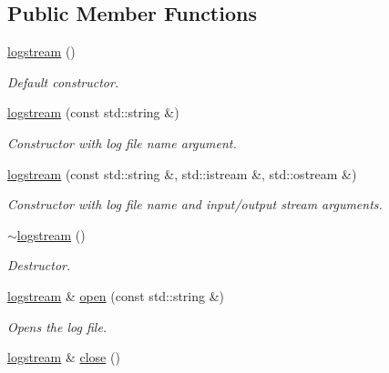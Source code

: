 \subsection*{Public Member Functions}
\begin{DoxyCompactItemize}
\item 
\hypertarget{a00326_a59f934ba427fe75d4c8a1f4501f5101a}{\hyperlink{a00326_a59f934ba427fe75d4c8a1f4501f5101a}{logstream} ()}\label{a00326_a59f934ba427fe75d4c8a1f4501f5101a}

\begin{DoxyCompactList}\small\item\em Default constructor. \end{DoxyCompactList}\item 
\hypertarget{a00326_aa61e2bcd90b857f4399cfd80b7118475}{\hyperlink{a00326_aa61e2bcd90b857f4399cfd80b7118475}{logstream} (const std\-::string \&)}\label{a00326_aa61e2bcd90b857f4399cfd80b7118475}

\begin{DoxyCompactList}\small\item\em Constructor with log file name argument. \end{DoxyCompactList}\item 
\hyperlink{a00326_ac6caf435a7fc57e53d45c928680037d8}{logstream} (const std\-::string \&, std\-::istream \&, std\-::ostream \&)
\begin{DoxyCompactList}\small\item\em Constructor with log file name and input/output stream arguments. \end{DoxyCompactList}\item 
\hypertarget{a00326_a1892de99cb47b8b1eb893f2216e8525b}{\hyperlink{a00326_a1892de99cb47b8b1eb893f2216e8525b}{$\sim$logstream} ()}\label{a00326_a1892de99cb47b8b1eb893f2216e8525b}

\begin{DoxyCompactList}\small\item\em Destructor. \end{DoxyCompactList}\item 
\hypertarget{a00326_ae4584dbcbedac153a276ff21098d0793}{\hyperlink{a00326}{logstream} \& \hyperlink{a00326_ae4584dbcbedac153a276ff21098d0793}{open} (const std\-::string \&)}\label{a00326_ae4584dbcbedac153a276ff21098d0793}

\begin{DoxyCompactList}\small\item\em Opens the log file. \end{DoxyCompactList}\item 
\hypertarget{a00326_abade997a668239429b3b8421ce176b04}{\hyperlink{a00326}{logstream} \& \hyperlink{a00326_abade997a668239429b3b8421ce176b04}{close} ()}\label{a00326_abade997a668239429b3b8421ce176b04}


\end{DoxyCompactItemize}
